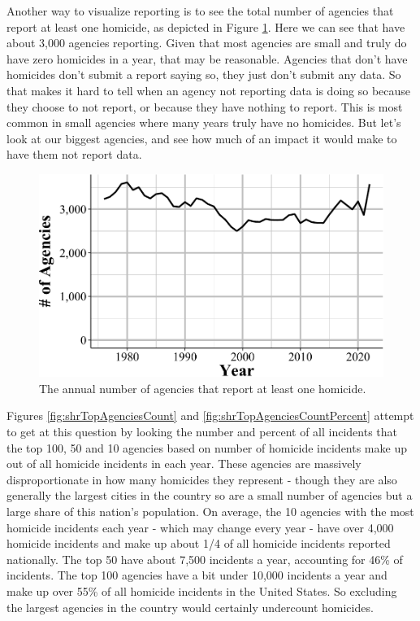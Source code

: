 \documentclass[
  12pt,
  openany]{book}
\begin{document}
Another way to visualize reporting is to see the total number of agencies that report at least one homicide, as depicted in Figure \ref{fig:shrAnnualAgencies}. Here we can see that have about 3,000 agencies reporting. Given that most agencies are small and truly do have zero homicides in a year, that may be reasonable. Agencies that don't have homicides don't submit a report saying so, they just don't submit any data. So that makes it hard to tell when an agency not reporting data is doing so because they choose to not report, or because they have nothing to report. This is most common in small agencies where many years truly have no homicides. But let's look at our biggest agencies, and see how much of an impact it would make to have them not report data.

\begin{figure}

{\centering \includegraphics[width=0.9\linewidth]{06_shr_files/figure-latex/shrAnnualAgencies-1} 

}

\caption{The annual number of agencies that report at least one homicide.}\label{fig:shrAnnualAgencies}
\end{figure}

Figures \ref{fig:shrTopAgenciesCount} and \ref{fig:shrTopAgenciesCountPercent} attempt to get at this question by looking the number and percent of all incidents that the top 100, 50 and 10 agencies based on number of homicide incidents make up out of all homicide incidents in each year. These agencies are massively disproportionate in how many homicides they represent - though they are also generally the largest cities in the country so are a small number of agencies but a large share of this nation's population. On average, the 10 agencies with the most homicide incidents each year - which may change every year - have over 4,000 homicide incidents and make up about 1/4 of all homicide incidents reported nationally. The top 50 have about 7,500 incidents a year, accounting for 46\% of incidents. The top 100 agencies have a bit under 10,000 incidents a year and make up over 55\% of all homicide incidents in the United States. So excluding the largest agencies in the country would certainly undercount homicides.
\end{document}
